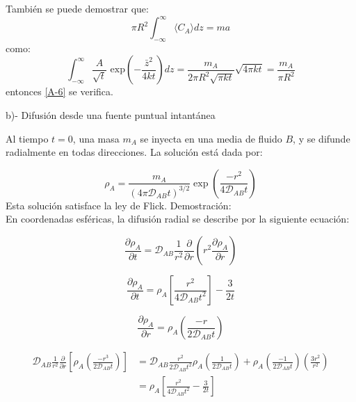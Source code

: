     También se puede demostrar que:
    \begin{equation*}
        \pi R^2 \int_{-\infty}^{\infty}\langle C_A\rangle dz=ma
        \tag{A-6}
        \label{A-6}
    \end{equation*}
    como:
    \begin{equation*}
        \int_{-\infty}^{\infty}\frac{A}{\sqrt{t}}\text{ exp}\left( -\frac{\bar{z}^2}{4kt}\right)dz=\frac{m_A}{2 \pi R^2 \sqrt{\pi kt}}\sqrt{4\pi kt}=\frac{m_A}{\pi R^2}
    \end{equation*}
    entonces \eqref{A-6} se verifica.

    \vspace{1 cm}
    b)- Difusión desde una fuente puntual intantánea
    
    \vspace{0.5 cm}
    Al tiempo \( t=0 \), una masa \( m_A \) se inyecta en una media de fluido \( B \), y se difunde radialmente en todas direcciones. La solución está dada por:

    \begin{equation*}
        \rho_A = \frac{m_A}{(4\pi \mathscr{D}_{AB}t)^{3/2}} \exp\left( \frac{-r^2}{4 \mathscr{D}_{AB} t} \right)
        \tag{A-7}
        \label{A-7}
    \end{equation*}
    Esta solución satisface la ley de Flick. Demostración:\\
    En coordenadas esféricas, la difusión radial se describe por la siguiente ecuación:
    
    \[
        \frac{\partial \rho_A}{\partial t} = \mathscr{D}_{AB} \frac{1}{r^2} \frac{\partial}{\partial r} \left( r^2 \frac{\partial \rho_A}{\partial r} \right)
        \tag{A-8}
        \label{A-8}
    \]

    \[
        \frac{\partial \rho_A}{\partial t} = \rho_A \left[ \frac{r^2}{4 \mathscr{D}_{AB} t^2} \right] - \frac{3}{2t}
    \]

    \[
        \frac{\partial \rho_A}{\partial r} = \rho_A \left( \frac{-r}{2 \mathscr{D}_{AB} t} \right)
    \]

    \begin{align*}
    \mathscr{D}_{AB} \frac{1}{r^2} \frac{\partial}{\partial r} \left[ \rho_A \left( \frac{-r^3}{2 \mathscr{D}_{AB} t} \right) \right] 
    &= \mathscr{D}_{AB} \frac{r^2}{2 \mathscr{D}_{AB} t^2} \rho_A \left( \frac{1}{2 \mathscr{D}_{AB} t} \right) 
    + \rho_A \left( \frac{-1}{2 \mathscr{D}_{AB} t} \right) \left( \frac{3 r^2}{r^2} \right) \\
    &= \rho_A \left[ \frac{r^2}{4 \mathscr{D}_{AB} t^2} - \frac{3}{2t} \right]
\end{align*}


